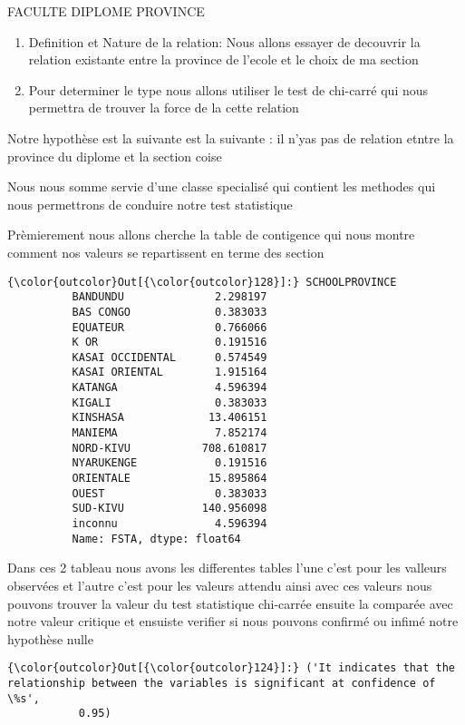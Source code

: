 \documentclass[11pt]{article}
\providecommand{\tightlist}{%
      \setlength{\itemsep}{0pt}\setlength{\parskip}{0pt}}
\begin{document}
    FACULTE DIPLOME PROVINCE

    \begin{enumerate}
\def\labelenumi{\arabic{enumi}.}
\tightlist
\item
  Definition et Nature de la relation: Nous allons essayer de decouvrir
  la relation existante entre la province de l'ecole et le choix de ma
  section
\item
  Pour determiner le type nous allons utiliser le test de chi-carré qui
  nous permettra de trouver la force de la cette relation
\end{enumerate}

    Notre hypothèse est la suivante est la suivante : il n'yas pas de
relation etntre la province du diplome et la section coise

    Nous nous somme servie d'une classe specialisé qui contient les methodes
qui nous permettrons de conduire notre test statistique

    Prèmierement nous allons cherche la table de contigence qui nous montre
comment nos valeurs se repartissent en terme des section

            \begin{Verbatim}[commandchars=\\\{\}]
{\color{outcolor}Out[{\color{outcolor}128}]:} SCHOOLPROVINCE
          BANDUNDU              2.298197
          BAS CONGO             0.383033
          EQUATEUR              0.766066
          K OR                  0.191516
          KASAI OCCIDENTAL      0.574549
          KASAI ORIENTAL        1.915164
          KATANGA               4.596394
          KIGALI                0.383033
          KINSHASA             13.406151
          MANIEMA               7.852174
          NORD-KIVU           708.610817
          NYARUKENGE            0.191516
          ORIENTALE            15.895864
          OUEST                 0.383033
          SUD-KIVU            140.956098
          inconnu               4.596394
          Name: FSTA, dtype: float64
\end{Verbatim}
        
    Dans ces 2 tableau nous avons les differentes tables l'une c'est pour
les valleurs observées et l'autre c'est pour les valeurs attendu ainsi
avec ces valeurs nous pouvons trouver la valeur du test statistique
chi-carrée ensuite la comparée avec notre valeur critique et ensuiste
verifier si nous pouvons confirmé ou infimé notre hypothèse nulle

            \begin{Verbatim}[commandchars=\\\{\}]
{\color{outcolor}Out[{\color{outcolor}124}]:} ('It indicates that the relationship between the variables is significant at confidence of \%s',
           0.95)
\end{Verbatim}
        
\end{document}
